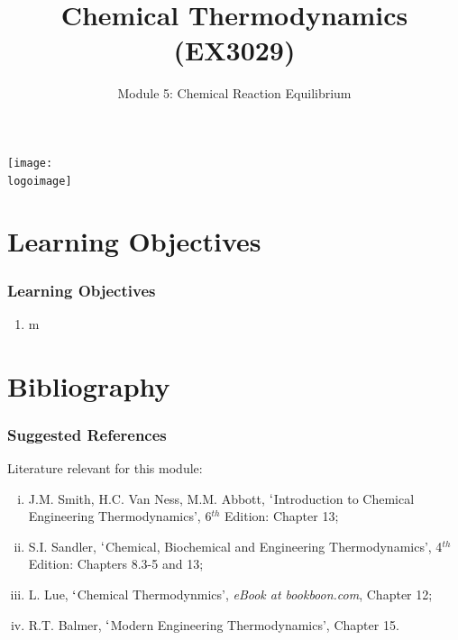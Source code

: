 \documentclass[10pt,compress,unknownkeysallowed]{beamer}
\institute{School of Engineering}
\title{Chemical Thermodynamics (EX3029)}
\subtitle{Module 5: Chemical Reaction Equilibrium}
\date[ ]{ }
\newcommand{\logoimage}{../../FigBanner/UoAHorizBanner}
\begin{document}
\begin{frame}
  \titlepage
  \vfill%
  \begin{center}
    \texttt{[image: \\logoimage]}
  \end{center}
\end{frame}




\section{Learning Objectives}

\begin{frame}
 \frametitle{Learning Objectives}
   \begin{enumerate}
     \item<1-> m
   \end{enumerate}
\end{frame}


\section{Bibliography}
\begin{frame}
 \frametitle{Suggested References}
  Literature relevant for this module:
  \begin{enumerate}[(i)]
   \item\label{SVN_Book} J.M. Smith, H.C. Van Ness, M.M. Abbott, $\lq$Introduction to Chemical Engineering Thermodynamics', 6$^{th}$ Edition: Chapter 13;
   \item\label{Sandle_Book} S.I. Sandler, $\lq$Chemical, Biochemical and Engineering Thermodynamics', 4$^{th}$ Edition: Chapters 8.3-5 and 13;
   \item\label{Lue_Book} L. Lue, $\lq$Chemical Thermodynmics', {\it eBook at bookboon.com}, Chapter 12;
   \item\label{Balmer_Book}R.T. Balmer, $\lq$Modern Engineering Thermodynamics', Chapter 15.
  \end{enumerate}
\end{frame}
\end{document}

